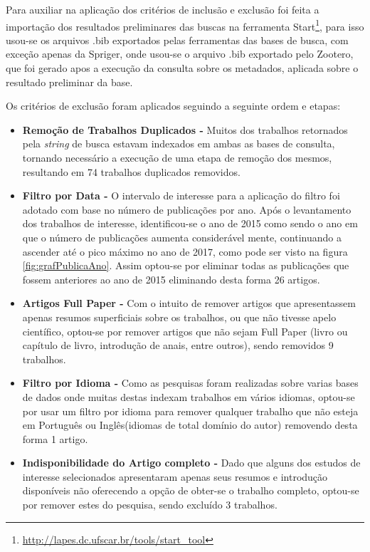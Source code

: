 \documentclass[tid,table]{texufpel} %
\begin{document}
Para auxiliar na aplicação dos critérios de inclusão e exclusão foi feita a importação dos resultados preliminares das buscas na ferramenta Start\footnote{\url{http://lapes.dc.ufscar.br/tools/start_tool}},
para isso usou-se os arquivos .bib exportados pelas ferramentas das bases de busca, com exceção apenas da Spriger, onde usou-se o arquivo .bib exportado pelo Zootero, que foi gerado apos a execução da consulta sobre os metadados, aplicada sobre o resultado preliminar da base.

Os critérios de exclusão foram aplicados seguindo a seguinte ordem e etapas:

\begin{itemize}
	\item  \textbf{Remoção de Trabalhos Duplicados - } Muitos dos trabalhos retornados pela \textit{string} de busca estavam indexados em ambas as bases de consulta, tornando necessário a execução de uma etapa de remoção dos mesmos, resultando em 74 trabalhos duplicados removidos.
	
	\item  \textbf{Filtro por Data - } O intervalo de interesse para a aplicação do filtro foi adotado com base no número de publicações por ano. Após o levantamento dos trabalhos de interesse, identificou-se o ano de 2015 como sendo o ano em que o número de publicações aumenta considerável mente, continuando a ascender até o pico máximo no ano de 2017, como pode ser visto na figura \ref{fig:grafPublicaAno}. Assim optou-se por eliminar todas as publicações que fossem anteriores ao ano de 2015 eliminando desta forma 26 artigos.	
	
	\item  \textbf{Artigos Full Paper - } Com o intuito de remover artigos que apresentassem apenas resumos superficiais sobre os trabalhos, ou que não tivesse apelo científico, optou-se por remover artigos que não sejam Full Paper (livro ou capítulo de livro, introdução de anais, entre outros), sendo removidos 9 trabalhos.
	
	\item  \textbf{Filtro por Idioma - } Como as pesquisas foram realizadas sobre varias bases de dados onde muitas destas indexam trabalhos em vários idiomas, optou-se por usar um filtro por idioma para remover qualquer trabalho que não esteja em Português ou Inglês(idiomas de total domínio do autor) removendo desta forma 1 artigo.
	
	\item  \textbf{Indisponibilidade do Artigo completo - } Dado que alguns dos estudos de interesse selecionados apresentaram apenas seus resumos e introdução disponíveis não oferecendo a opção de obter-se o trabalho completo, optou-se por remover estes do pesquisa, sendo excluído 3 trabalhos.
	

\end{itemize}
\end{document}
